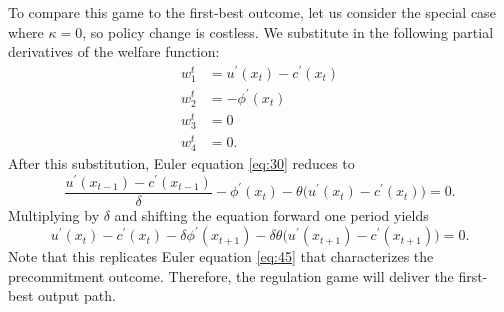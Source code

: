 To compare this game to the first-best outcome, let us consider the special
case where $\kappa =0$, so policy change is costless. We substitute in the
following partial derivatives of the welfare function: 
\begin{align}
w_{1}^{t}& =u^{\prime }(x_{t})-c^{\prime }(x_{t})  \label{eq:70} \\
w_{2}^{t}& =-\phi ^{\prime }(x_{t}) \\
w_{3}^{t}& =0 \\
w_{4}^{t}& =0.
\end{align}%
After this substitution, Euler equation \eqref{eq:30} reduces to 
\begin{equation}
\frac{u^{\prime }(x_{t-1})-c^{\prime }(x_{t-1})}{\delta }-\phi ^{\prime
}(x_{t})-\theta \big(u^{\prime }(x_{t})-c^{\prime }(x_{t})\big)=0.
\label{eq:71}
\end{equation}%
Multiplying by $\delta $ and shifting the equation forward one period yields 
\begin{equation}
u^{\prime }(x_{t})-c^{\prime }(x_{t})-\delta \phi ^{\prime }(x_{t+1})-\delta
\theta \big(u^{\prime }(x_{t+1})-c^{\prime }(x_{t+1})\big)=0\text{.}
\label{eq:72}
\end{equation}%
Note that this replicates Euler equation \eqref{eq:45} that characterizes
the precommitment outcome. Therefore, the regulation game will deliver the
first-best output path.
